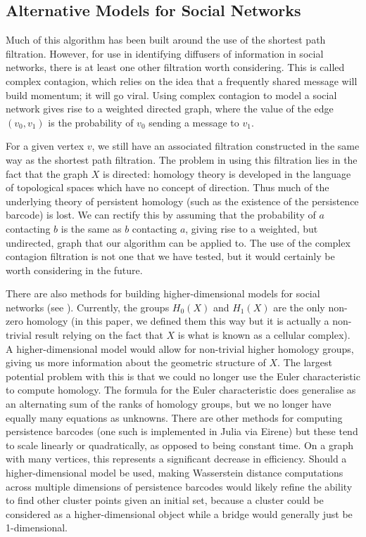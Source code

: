 \documentclass[12pt,a4paper]{amsart}
\numberwithin{equation}{section}
\theoremstyle{plain}
\theoremstyle{definition}
\begin{document}
\subsection{Alternative Models for Social Networks} Much of this algorithm has been built around the use of the shortest path filtration. However, for use in identifying diffusers of information in social networks, there is at least one other filtration worth considering. This is called complex contagion, which relies on the idea that a frequently shared message will build momentum; it will go viral. Using complex contagion to model a social network gives rise to a weighted directed graph, where the value of the edge $(v_0,v_1)$ is the probability of $v_0$ sending a message to $v_1$. 

For a given vertex $v$, we still have an associated filtration constructed in the same way as the shortest path filtration. The problem in using this filtration lies in the fact that the graph $X$ is directed: homology theory is developed in the language of topological spaces which have no concept of direction. Thus much of the underlying theory of persistent homology (such as the existence of the persistence barcode) is lost. We can rectify this by assuming that the probability of $a$ contacting $b$ is the same as $b$ contacting $a$, giving rise to a weighted, but undirected, graph that our algorithm can be applied to. The use of the complex contagion filtration is not one that we have tested, but it would certainly be worth considering in the future. 

There are also methods for building higher-dimensional models for social networks (see \cite{highdim}). Currently, the groups $H_0(X)$ and $H_1(X)$ are the only non-zero homology (in this paper, we defined them this way but it is actually a non-trivial result relying on the fact that $X$ is what is known as a cellular complex). A higher-dimensional model would allow for non-trivial higher homology groups, giving us more information about the geometric structure of $X$. The largest potential problem with this is that we could no longer use the Euler characteristic to compute homology. The formula for the Euler characteristic does generalise as an alternating sum of the ranks of homology groups, but we no longer have equally many equations as unknowns. There are other methods for computing persistence barcodes (one such is implemented in Julia via Eirene) but these tend to scale linearly or quadratically, as opposed to being constant time. On a graph with many vertices, this represents a significant decrease in efficiency. Should a higher-dimensional model be used, making Wasserstein distance computations across multiple dimensions of persistence barcodes would likely refine the ability to find other cluster points given an initial set, because a cluster could be considered as a higher-dimensional object while a bridge would generally just be 1-dimensional.
\end{document}
